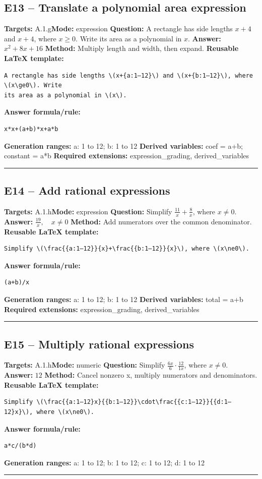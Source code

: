 \documentclass[11pt]{article}
\begin{document}
\subsection{E13 -- Translate a polynomial area expression}
\textbf{Targets:} A.1.g\quad\textbf{Mode:} expression
\textbf{Question:} A rectangle has side lengths \(x+4\) and \(x+4\), where \(x\ge0\). Write its area as a polynomial in \(x\).
\textbf{Answer:} \(x^2+8x+16\)
\textbf{Method:} Multiply length and width, then expand.
\textbf{Reusable LaTeX template:}
\begin{verbatim}
A rectangle has side lengths \(x+{a:1–12}\) and \(x+{b:1–12}\), where \(x\ge0\). Write
its area as a polynomial in \(x\).
\end{verbatim}
\textbf{Answer formula/rule:}
\begin{verbatim}
x*x+(a+b)*x+a*b
\end{verbatim}
\textbf{Generation ranges:} a: 1 to 12; b: 1 to 12
\textbf{Derived variables:} coef = a+b; constant = a*b
\textbf{Required extensions:} expression\_grading, derived\_variables
\medskip\hrule\medskip
\subsection{E14 -- Add rational expressions}
\textbf{Targets:} A.1.h\quad\textbf{Mode:} expression
\textbf{Question:} Simplify \(\frac{11}{x}+\frac{8}{x}\), where \(x\ne0\).
\textbf{Answer:} \(\frac{19}{x},\quad x\ne0\)
\textbf{Method:} Add numerators over the common denominator.
\textbf{Reusable LaTeX template:}
\begin{verbatim}
Simplify \(\frac{{a:1–12}}{x}+\frac{{b:1–12}}{x}\), where \(x\ne0\).
\end{verbatim}
\textbf{Answer formula/rule:}
\begin{verbatim}
(a+b)/x
\end{verbatim}
\textbf{Generation ranges:} a: 1 to 12; b: 1 to 12
\textbf{Derived variables:} total = a+b
\textbf{Required extensions:} expression\_grading, derived\_variables
\medskip\hrule\medskip
\subsection{E15 -- Multiply rational expressions}
\textbf{Targets:} A.1.h\quad\textbf{Mode:} numeric
\textbf{Question:} Simplify \(\frac{6x}{6}\cdot\frac{12}{1x}\), where \(x\ne0\).
\textbf{Answer:} \(12\)
\textbf{Method:} Cancel nonzero x, multiply numerators and denominators.
\textbf{Reusable LaTeX template:}
\begin{verbatim}
Simplify \(\frac{{a:1–12}x}{{b:1–12}}\cdot\frac{{c:1–12}}{{d:1–12}x}\), where \(x\ne0\).
\end{verbatim}
\textbf{Answer formula/rule:}
\begin{verbatim}
a*c/(b*d)
\end{verbatim}
\textbf{Generation ranges:} a: 1 to 12; b: 1 to 12; c: 1 to 12; d: 1 to 12
\medskip\hrule\medskip
\end{document}
